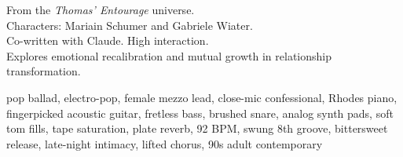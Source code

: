 

\begin{notes}
From the \emph{Thomas’ Entourage} universe.\\
Characters: Mariain Schumer and Gabriele Wiater.\\
Co-written with Claude. %
High interaction.\\
Explores emotional recalibration and mutual growth in relationship transformation.
\end{notes}

\begin{style}
pop ballad, electro-pop, female mezzo lead, close-mic confessional, Rhodes piano, fingerpicked acoustic guitar, fretless bass, brushed snare, analog synth pads, soft tom fills, tape saturation, plate reverb, 92 BPM, swung 8th groove, bittersweet release, late-night intimacy, lifted chorus, 90s adult contemporary
\end{style}

